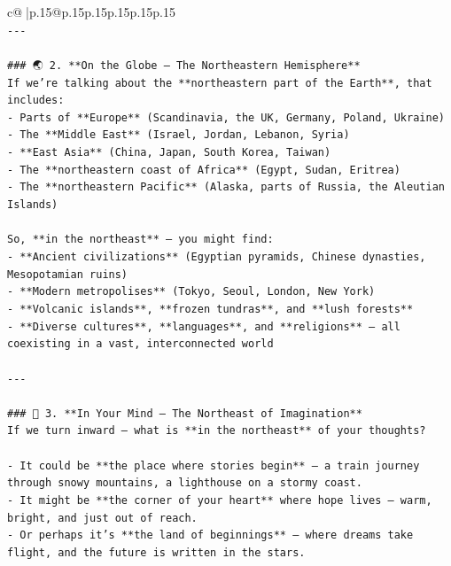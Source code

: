 \documentclass{article}
\begin{document}
{\begin{supertabular}{c@{$\;$}|p{.15\linewidth}@{}p{.15\linewidth}p{.15\linewidth}p{.15\linewidth}p{.15\linewidth}p{.15\linewidth}}
{{{\\ 
\texttt{{-}{-}{-}} \\
\\ 
\texttt{\#\#\# 🌏 2. **On the Globe — The Northeastern Hemisphere**} \\
\texttt{If we’re talking about the **northeastern part of the Earth**, that includes:} \\
\texttt{{-} Parts of **Europe** (Scandinavia, the UK, Germany, Poland, Ukraine)} \\
\texttt{{-} The **Middle East** (Israel, Jordan, Lebanon, Syria)} \\
\texttt{{-} **East Asia** (China, Japan, South Korea, Taiwan)} \\
\texttt{{-} The **northeastern coast of Africa** (Egypt, Sudan, Eritrea)} \\
\texttt{{-} The **northeastern Pacific** (Alaska, parts of Russia, the Aleutian Islands)} \\
\\ 
\texttt{So, **in the northeast** — you might find:} \\
\texttt{{-} **Ancient civilizations** (Egyptian pyramids, Chinese dynasties, Mesopotamian ruins)} \\
\texttt{{-} **Modern metropolises** (Tokyo, Seoul, London, New York)} \\
\texttt{{-} **Volcanic islands**, **frozen tundras**, and **lush forests**} \\
\texttt{{-} **Diverse cultures**, **languages**, and **religions** — all coexisting in a vast, interconnected world} \\
\\ 
\texttt{{-}{-}{-}} \\
\\ 
\texttt{\#\#\# 🧠 3. **In Your Mind — The Northeast of Imagination**} \\
\texttt{If we turn inward — what is **in the northeast** of your thoughts?} \\
\\ 
\texttt{{-} It could be **the place where stories begin** — a train journey through snowy mountains, a lighthouse on a stormy coast.} \\
\texttt{{-} It might be **the corner of your heart** where hope lives — warm, bright, and just out of reach.} \\
\texttt{{-} Or perhaps it’s **the land of beginnings** — where dreams take flight, and the future is written in the stars.} \\
\\ 
}}}
\end{supertabular}}
\end{document}
